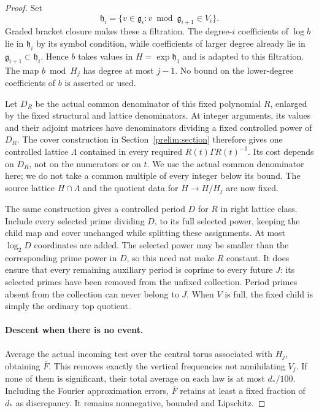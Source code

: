 \begin{proof}
Set
\[
 \mathfrak h_i=\{v\in\mathfrak g_i:
             v\bmod\mathfrak g_{i+1}\in V_i\}.
\]
Graded bracket closure makes these a filtration.  The degree-$i$
coefficients of $\log b$ lie in $\mathfrak h_i$ by its symbol
condition, while coefficients of larger degree already lie in
$\mathfrak g_{i+1}\subset\mathfrak h_i$.
Hence $b$ takes values in $H=\exp\mathfrak h_1$ and is adapted to
this filtration.  The map $b\bmod H_j$ has degree at most $j-1$.
No bound on the lower-degree coefficients of $b$ is asserted or used.

Let $D_R$ be the actual common denominator of this fixed polynomial
$R$, enlarged by the fixed structural and lattice denominators.
At integer arguments, its values and their adjoint matrices have
denominators dividing a fixed controlled power of $D_R$.
The cover construction in Section~\ref{prelim:section} therefore
gives one controlled lattice $\Lambda$ contained in every required
$R(t)\Gamma R(t)^{-1}$.  Its cost depends on $D_R$, not on the
numerators or on $t$.  We use the actual common denominator here;
we do not take a common multiple of every integer below its bound.
The source lattice $H\cap\Lambda$ and the quotient data for
$H\to H/H_j$ are now fixed.

The same construction gives a controlled period $D$ for $R$ in
right lattice class.  Include every selected prime dividing $D$,
to its full selected power, keeping the child map and cover
unchanged while splitting these assignments.  At most $\log_2D$
coordinates are added.  The selected power may be smaller than
the corresponding prime power in $D$, so this need not make $R$
constant.  It does ensure that every remaining auxiliary period
is coprime to every future $J$: its selected primes have been
removed from the unfixed collection.  Period primes absent from
the collection can never belong to $J$.
When $V$ is full, the fixed child is simply the ordinary top quotient.

\paragraph{Descent when there is no event.}
Average the actual incoming test over the central torus associated
with $H_j$, obtaining $\bar F$.  This removes exactly the vertical
frequencies not annihilating $V_j$.  If none of them is significant,
their total average on each law is at most $d_*/100$.
Including the Fourier approximation errors, $\bar F$ retains at
least a fixed fraction of $d_*$ as discrepancy.  It remains
nonnegative, bounded and Lipschitz.


\end{proof}
